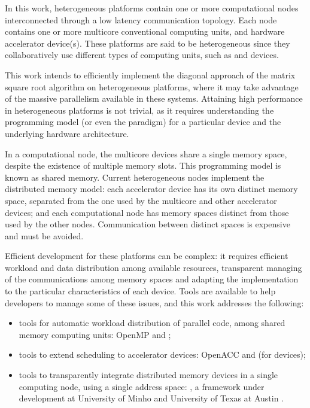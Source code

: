 
In this work, heterogeneous platforms contain one or more computational nodes interconnected through a low latency communication topology. Each node contains one or more multicore conventional computing units, and hardware accelerator device(s). These platforms are said to be heterogeneous since they collaboratively use different types of computing units, such as \gpus and \intel\mic devices.

This work intends to efficiently implement the diagonal approach of the matrix square root algorithm on heterogeneous platforms, where it may take advantage of the massive parallelism available in these systems. Attaining high performance in heterogeneous platforms is not trivial, as it requires understanding the programming model (or even the paradigm) for a particular device and the underlying hardware architecture.

In a computational node, the multicore \cpu devices share a single memory space, despite the existence of multiple memory slots.
This programming model is known as shared memory.
Current heterogeneous nodes implement the distributed memory model: each accelerator device has its own distinct memory space, separated from the one used by the multicore and other accelerator devices; and each computational node has memory spaces distinct from those used by the other nodes. Communication between distinct spaces is expensive and must be avoided.

Efficient development for these platforms can be complex: it requires efficient workload and data distribution among available resources, transparent managing of the communications among memory spaces and adapting the implementation to the particular characteristics of each device. Tools are available to help developers to manage some of these issues, and this work addresses the following:
\begin{itemize}
	\item tools for automatic workload distribution of parallel code, among shared memory computing units: OpenMP and \tbb\cite{TBB};
	\item tools to extend scheduling to accelerator devices: \mbox{OpenACC\cite{OpenACC}} and \tbb (for \intel devices)\cite{Intel:MIC:QuickStartGuide};
	\item tools to transparently integrate distributed memory devices in a single computing node, using a single address space: \gama, a framework under development at University of Minho and University of Texas at Austin \cite{Mariano:Alves:2012}.
\end{itemize}
